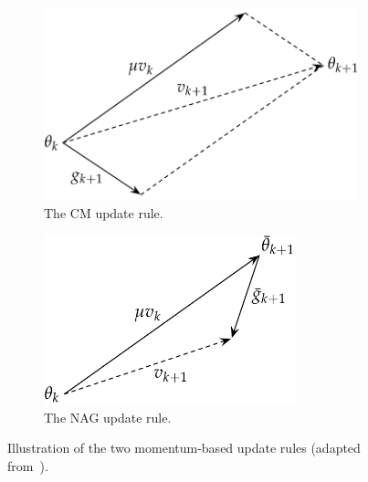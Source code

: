 \documentclass[11pt,a4paper]{article}
\numberwithin{equation}{section}
\begin{document}
\begin{figure}[t]
\centering
\begin{subfigure}[t]{0.4\textwidth}
	\centering
	\includegraphics[width=\textwidth]{graphics/cm_diagram.pdf}
	\caption{The CM update rule.\label{fig:cm_update}}
\end{subfigure}
\begin{subfigure}[t]{0.4\textwidth}
	\centering
	\includegraphics[width=0.8\textwidth]{graphics/nag_diagram.pdf}
	\caption{The NAG update rule.\label{fig:nag_update}}
\end{subfigure}
\caption{Illustration of the two momentum-based update rules (adapted
from~\citet{sutskever2013importance}).\label{fig:momentum_updates}}
\end{figure}
\end{document}
